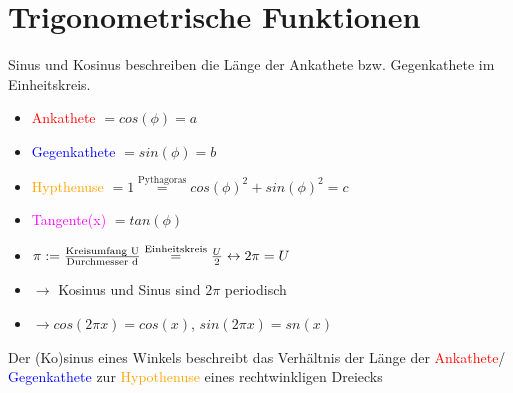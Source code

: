 \section{Trigonometrische Funktionen}

\begin{definition}[Einheitskreis]
Sinus und Kosinus beschreiben die Länge der Ankathete bzw. Gegenkathete im Einheitskreis.

\begin{multicols}{2}
	\begin{itemize}[label={}, noitemsep]
		\item \textcolor{red}{Ankathete} $= cos(\phi) = a$
		\item \textcolor{blue}{Gegenkathete} $= sin(\phi) = b$
		\item \textcolor{orange}{Hypthenuse} $= 1 \overset{\text{Pythagoras}}{=} cos(\phi)^2 + sin(\phi)^2 = c$	
		\item \textcolor{magenta}{Tangente(x)} $= tan(\phi)$			
		\item $\pi := \frac{\textnormal{Kreisumfang U}}{\textnormal{Durchmesser d}} \overset{\text{Einheitskreis}}{=} \frac{U}{2} \leftrightarrow 2 \pi = U $
		\item $\rightarrow$ Kosinus und Sinus sind $2 \pi$ periodisch
		\item $\rightarrow cos(2 \pi x) = cos(x)$, $sin(2 \pi x) = sn(x)$
	\end{itemize}
\end{multicols}
\end{definition}

\begin{definition}
	Der (Ko)sinus eines Winkels beschreibt das Verhältnis der Länge der \textcolor{red}{Ankathete}/ \textcolor{blue}{Gegenkathete} zur \textcolor{orange}{Hypothenuse} eines rechtwinkligen Dreiecks
\end{definition}

